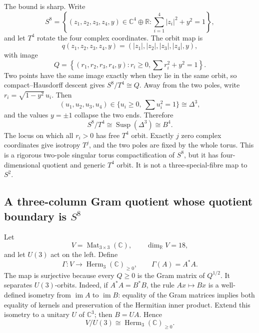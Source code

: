 The bound is sharp.  Write
\[
 S^8=\left\{(z_1,z_2,z_3,z_4,y)\in\mathbb C^4\oplus\mathbb R:
       \sum_{i=1}^4|z_i|^2+y^2=1\right\},
\]
and let $T^4$ rotate the four complex coordinates.  The orbit map is
\[
 q(z_1,z_2,z_3,z_4,y)
 =(|z_1|,|z_2|,|z_3|,|z_4|,y),
\]
with image
\[
 Q=\left\{(r_1,r_2,r_3,r_4,y):r_i\geq0,
       \sum r_i^2+y^2=1\right\}.
\]
Two points have the same image exactly when they lie in the same orbit, so
compact--Hausdorff descent gives $S^8/T^4\cong Q$.  Away from the two poles,
write $r_i=\sqrt{1-y^2}\,u_i$.  Then
\[
 (u_1,u_2,u_3,u_4)\in
 \{u_i\geq0,\ \sum u_i^2=1\}\cong\Delta^3,
\]
and the values $y=\pm1$ collapse the two ends.  Therefore
\begin{equation}
 \boxed{S^8/T^4\cong\operatorname{Susp}(\Delta^3)\cong B^4.}
 \label{hrs8:eq:t4-quotient}
\end{equation}
The locus on which all $r_i>0$ has free $T^4$ orbit.  Exactly $j$ zero
complex coordinates give isotropy $T^j$, and the two poles are fixed by the
whole torus.  This is a rigorous two-pole singular torus compactification of
$S^8$, but it has four-dimensional quotient and generic $T^4$ orbit.  It is
not a three-special-fibre map to $S^2$.

\subsection{A three-column Gram quotient whose quotient boundary is \texorpdfstring{$S^8$}{S8}}
\label{hrs8:subsec:gram}

Let
\[
 V=\operatorname{Mat}_{3\times3}(\mathbb C),
 \qquad \dim_{\mathbb R}V=18,
\]
and let $U(3)$ act on the left.  Define
\begin{equation}
 \Gamma\colon V\longrightarrow\operatorname{Herm}_3(\mathbb C)_{\geq0},
 \qquad \Gamma(A)=A^*A.
 \label{hrs8:eq:gram-map}
\end{equation}
The map is surjective because every $Q\geq0$ is the Gram matrix of
$Q^{1/2}$.  It separates $U(3)$-orbits.  Indeed, if $A^*A=B^*B$, the rule
$Ax\mapsto Bx$ is a well-defined isometry from $\operatorname{im}A$ to
$\operatorname{im}B$: equality of the Gram matrices implies both equality of
kernels and preservation of the Hermitian inner product.  Extend this
isometry to a unitary $U$ of $\mathbb C^3$; then $B=UA$.  Hence
\begin{equation}
 V/U(3)\cong\operatorname{Herm}_3(\mathbb C)_{\geq0}.
 \label{hrs8:eq:gram-orbit-space}
\end{equation}

